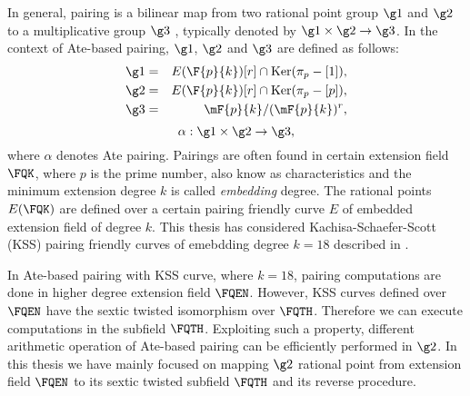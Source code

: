         In general, pairing is a bilinear map from two rational point group $\g1$ and $\g2$ to a multiplicative group $\g3$ \cite{Silverman}, typically denoted by $\g1 \times \g2 \rightarrow \g3$.
        In the context of Ate-based pairing, $\g1$, $\g2$ and $\g3$ are defined as follows:
        \begin{eqnarray}\label{eq:g_1}
        \g1 & = &  E(\F{p}{k}) [r] \cap \text{Ker}(\pi_p - [1]), \nonumber \\
        \g2 & = &  E(\F{p}{k}) [r] \cap \text{Ker}(\pi_p - [p]), \nonumber \\
        \g3 & = & \mF{p}{k}/(\mF{p}{k})^r, \nonumber
        \end{eqnarray}
        \begin{equation}
        \alpha : \g1 \times \g2 \rightarrow \g3,  \nonumber
        \end{equation}
        where $\alpha$ denotes Ate pairing. Pairings are often found in certain extension field $\FQK$, where $p$ is the prime number, also know as characteristics  and the minimum extension degree $k$ is called \textit{embedding} degree. 
        The rational points $E(\FQK)$ are defined over a certain pairing friendly curve $E$ of embedded extension field of degree $k$.
        This thesis has considered Kachisa-Schaefer-Scott (KSS) \cite{EPRINT:KacSchSco07} pairing friendly curves of emebdding degree $k=18$ described in \cite{EPRINT:FreScoTes06}. 
        
        In Ate-based pairing with KSS curve, where $k = 18$,  pairing computations are done in higher degree extension field $\FQEN$. However, KSS curves defined over $\FQEN$ have the sextic twisted isomorphism over $\FQTH$. Therefore we can execute computations in the subfield $\FQTH$. Exploiting such a property, different arithmetic operation of Ate-based pairing can be efficiently performed in $\g2$. In this thesis we have mainly focused on mapping $\g2$ rational point from extension field $\FQEN$ to its sextic twisted subfield $\FQTH$ and its reverse procedure. 
        
